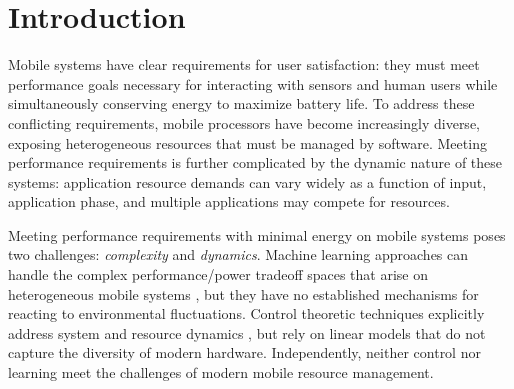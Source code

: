 \section{Introduction}
Mobile systems have clear requirements for user satisfaction: they
must meet performance goals necessary for interacting with sensors and
human users while simultaneously conserving energy to maximize battery life.  To
address these conflicting requirements, mobile processors have become
increasingly diverse, exposing heterogeneous resources that must be
managed by software. Meeting performance requirements is further
complicated by the dynamic nature of these systems: application
resource demands can vary widely as a function of input, application
phase, and multiple applications may compete for resources.

Meeting performance requirements with
minimal energy on mobile systems poses two challenges: \emph{complexity} and \emph{dynamics}.
Machine learning approaches can handle the complex performance/power
tradeoff spaces that arise on heterogeneous mobile systems
\cite{reddiHPCA2013,dubach2010,Bitirgen2008,Ipek,Koala,LEO,Flicker,Ponamarev},
but they have no established mechanisms for reacting to environmental
fluctuations.    Control theoretic techniques explicitly address
system and resource dynamics
\cite{Hellerstein2004a,Chen2011,PTRADE,POET,ControlWare,Agilos,grace2},
but rely on linear models that do not capture the diversity of modern
hardware.   Independently, neither control nor learning
meet the challenges of modern mobile resource management.

